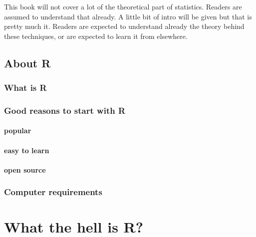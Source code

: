 \documentclass[
]{book}
\begin{document}
This book will not cover a lot of the theoretical part of statistics. Readers are assumed to understand that already. A little bit of intro will be given but that is pretty much it. Readers are expected to understand already the theory behind these techniques, or are expected to learn it from elsewhere.

\hypertarget{about-r}{%
\section{About R}\label{about-r}}

\hypertarget{what-is-r}{%
\subsection{What is R}\label{what-is-r}}

\hypertarget{good-reasons-to-start-with-r}{%
\subsection{Good reasons to start with R}\label{good-reasons-to-start-with-r}}

\hypertarget{popular}{%
\subsubsection{popular}\label{popular}}

\hypertarget{easy-to-learn}{%
\subsubsection{easy to learn}\label{easy-to-learn}}

\hypertarget{open-source}{%
\subsubsection{open source}\label{open-source}}

\hypertarget{computer-requirements}{%
\subsection{Computer requirements}\label{computer-requirements}}

\hypertarget{what-the-hell-is-r}{%
\chapter{What the hell is R?}\label{what-the-hell-is-r}}
\end{document}

